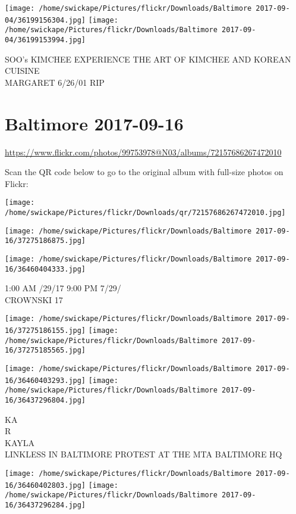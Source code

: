 \documentclass[10pt,letterpaper]{article}
\begin{document}
\texttt{[image: /home/swickape/Pictures/flickr/Downloads/Baltimore 2017-09-04/36199156304.jpg]}
\texttt{[image: /home/swickape/Pictures/flickr/Downloads/Baltimore 2017-09-04/36199153994.jpg]}

SOO's KIMCHEE EXPERIENCE THE ART OF KIMCHEE AND KOREAN CUISINE\\
MARGARET 6/26/01 RIP
\pagebreak

\section*{Baltimore 2017-09-16}

\url{https://www.flickr.com/photos/99753978@N03/albums/72157686267472010}

Scan the QR code below to go to the original album with full-size photos on Flickr:

\texttt{[image: /home/swickape/Pictures/flickr/Downloads/qr/72157686267472010.jpg]}
\pagebreak

\texttt{[image: /home/swickape/Pictures/flickr/Downloads/Baltimore 2017-09-16/37275186875.jpg]}

\vspace{0.25in}
\texttt{[image: /home/swickape/Pictures/flickr/Downloads/Baltimore 2017-09-16/36460404333.jpg]}

1:00 AM /29/17 9:00 PM 7/29/\\
CROWNSKI 17
\pagebreak

\texttt{[image: /home/swickape/Pictures/flickr/Downloads/Baltimore 2017-09-16/37275186155.jpg]}
\texttt{[image: /home/swickape/Pictures/flickr/Downloads/Baltimore 2017-09-16/37275185565.jpg]}

\texttt{[image: /home/swickape/Pictures/flickr/Downloads/Baltimore 2017-09-16/36460403293.jpg]}
\texttt{[image: /home/swickape/Pictures/flickr/Downloads/Baltimore 2017-09-16/36437296804.jpg]}

KA\\
R\\
KAYLA\\
LINKLESS IN BALTIMORE PROTEST AT THE MTA BALTIMORE HQ
\pagebreak

\texttt{[image: /home/swickape/Pictures/flickr/Downloads/Baltimore 2017-09-16/36460402803.jpg]}
\texttt{[image: /home/swickape/Pictures/flickr/Downloads/Baltimore 2017-09-16/36437296284.jpg]}
\end{document}
